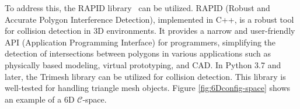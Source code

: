 \documentclass{ctuthesis}
\begin{document}
To address this, the RAPID library~\cite{gottschalk1997rapid} can be utilized. 
RAPID (Robust and Accurate Polygon Interference Detection), implemented in C++, 
is a robust tool for collision detection in 3D environments. 
It provides a narrow and user-friendly API (Application Programming Interface) for programmers, 
simplifying the detection of intersections between polygons in various applications such as 
physically based modeling, virtual prototyping, and CAD.  
In Python 3.7 and later, the Trimesh library can be utilized for collision detection. 
This library is well-tested for handling triangle mesh objects. 
Figure \ref{fig:6Dconfig-space} shows an example of a 6D $\mathcal{C}$-space.
\end{document}
